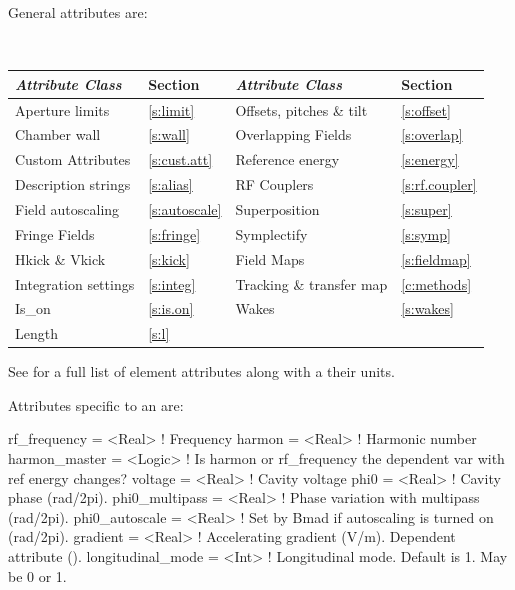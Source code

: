 {General  attributes are:
\begin{center}
\tt
\begin{tabular}{llll} \toprule
  {\sl Attribute Class}      & Section            & {\sl Attribute Class}      & Section            \\ \midrule
  Aperture limits            & \ref{s:limit}      & Offsets, pitches \& tilt   & \ref{s:offset}     \\
  Chamber wall               & \ref{s:wall}       & Overlapping Fields         & \ref{s:overlap}    \\
  Custom Attributes          & \ref{s:cust.att}   & Reference energy           & \ref{s:energy}     \\ 
  Description strings        & \ref{s:alias}      & RF Couplers                & \ref{s:rf.coupler} \\
  Field autoscaling          & \ref{s:autoscale}  & Superposition              & \ref{s:super}      \\
  Fringe Fields              & \ref{s:fringe}     & Symplectify                & \ref{s:symp}       \\
  Hkick \& Vkick             & \ref{s:kick}       & Field Maps                 & \ref{s:fieldmap}   \\
  Integration settings       & \ref{s:integ}      & Tracking \& transfer map   & \ref{c:methods}    \\
  Is_on                      & \ref{s:is.on}      & Wakes                      & \ref{s:wakes}      \\
  Length                     & \ref{s:l}          &                            &                    \\
  \bottomrule
\end{tabular}
\end{center}
\toffset
See  for a full list of element attributes along with a their units.

Attributes specific to an  are:
\begin{example}
  rf_frequency    = <Real>    ! Frequency
  harmon          = <Real>    ! Harmonic number
  harmon_master   = <Logic>   ! Is harmon or rf_frequency the dependent var with ref energy changes?
  voltage         = <Real>    ! Cavity voltage
  phi0            = <Real>    ! Cavity phase (rad/2pi).
  phi0_multipass  = <Real>    ! Phase variation with multipass (rad/2pi).
  phi0_autoscale  = <Real>    ! Set by Bmad if autoscaling is turned on (rad/2pi).
  gradient        = <Real>    ! Accelerating gradient (V/m). Dependent attribute ().
  longitudinal_mode = <Int>   ! Longitudinal mode. Default is 1. May be 0 or 1.
\end{example}

}
